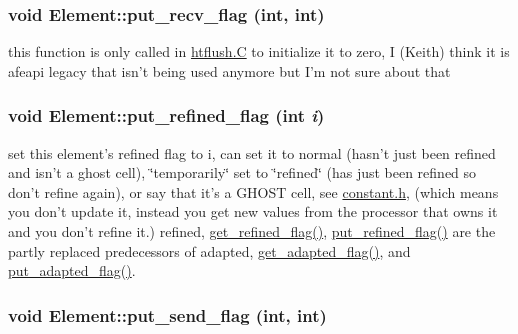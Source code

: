 \hypertarget{classElement_a39}{
\subsubsection[put\_\-recv\_\-flag]{\setlength{\rightskip}{0pt plus 5cm}void Element::put\_\-recv\_\-flag (int, int)}}
\label{classElement_a39}


this function is only called in \hyperlink{constant_8h_a21}{htflush.C} to initialize it to zero, I (Keith) think it is afeapi legacy that isn't being used anymore but I'm not sure about that 

\hypertarget{classElement_a36}{
\subsubsection[put\_\-refined\_\-flag]{\setlength{\rightskip}{0pt plus 5cm}void Element::put\_\-refined\_\-flag (int {\em i})}}
\label{classElement_a36}


set this element's refined flag to i, can set it to normal (hasn't just been refined and isn't a ghost cell), \char`\"{}temporarily\char`\"{} set to \char`\"{}refined\char`\"{} (has just been refined so don't refine again), or say that it's a GHOST cell, see \hyperlink{constant_8h}{constant.h}, (which means you don't update it, instead you get new values from the processor that owns it and you don't refine it.) refined, \hyperlink{classElement_a33}{get\_\-refined\_\-flag()}, \hyperlink{classElement_a36}{put\_\-refined\_\-flag()} are the partly replaced predecessors of adapted, \hyperlink{classElement_a34}{get\_\-adapted\_\-flag()}, and \hyperlink{classElement_a37}{put\_\-adapted\_\-flag()}. 

\hypertarget{classElement_a38}{
\subsubsection[put\_\-send\_\-flag]{\setlength{\rightskip}{0pt plus 5cm}void Element::put\_\-send\_\-flag (int, int)}}
\label{classElement_a38}


